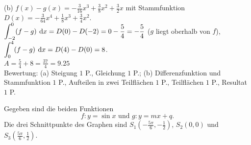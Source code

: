 \documentclass[11pt]{exam}
\begin{document}
\begin{questions}
{\begin{solution}
		(b) $f(x)-g(x)=-\frac{3}{16}x^3+\frac{3}{8}x^2+\frac{3}{2}x$ mit Stammfunktion $D(x)=-\frac{3}{64}x^4+\frac{1}{8}x^3+\frac{3}{4}x^2$.\\
		$\displaystyle\int_{-2}^0(f-g)\:\operatorname{d}\!{x}=D(0)-D(-2)=0-\frac{5}{4}=-\frac{5}{4}$ ($g$ liegt oberhalb von $f$), \quad $\displaystyle\int_0^4(f-g)\:\operatorname{d}\!{x}=D(4)-D(0)=8$.\\
		$A=\frac{5}{4}+8=\frac{37}{4}=9.25$\\
		Bewertung: (a) Steigung $1$ P., Gleichung $1$ P.; (b) Differenzfunktion und Stammfunktion $1$ P., Aufteilen in zwei Teilflächen $1$ P., Teilflächen $1$ P., Resultat $1$ P.
\end{solution}}
{}

\noaddpoints
\question[\totalpoints]
\addpoints
\begin{minipage}{0.6\linewidth}
    Gegeben sind die beiden Funktionen \[f:y=\sin{x} \text{ und } g:y=mx+q.\] Die drei Schnittpunkte des Graphen sind $S_1\left(-\frac{5\pi}{6},-\frac{1}{2}\right)$, $S_2(0,0)$ und $S_3\left(\frac{5\pi}{6},\frac{1}{2}\right)$.\vspace{5pt}
\end{minipage}
\end{questions}
\end{document}
